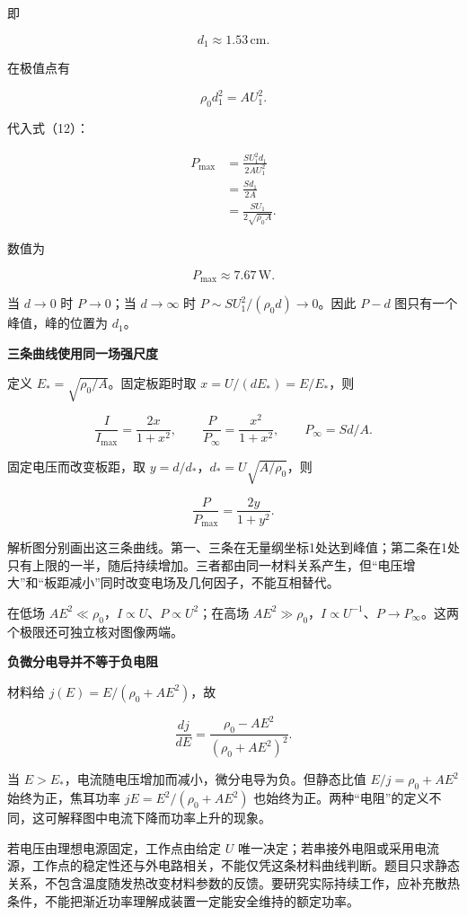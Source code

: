\documentclass[12pt,a4paper,UTF8]{ctexart}
\begin{document}
即

\[
\boxed{d_1\approx1.53\,\mathrm{cm}}.
\tag{15}
\]

在极值点有

\[
\rho_0d_1^2=AU_1^2.
\]

代入式（12）：

\[
\begin{aligned}
P_{\max}
&=\frac{SU_1^2d_1}{2AU_1^2}\\
&=\frac{Sd_1}{2A}\\
&=\frac{SU_1}{2\sqrt{\rho_0A}}.
\end{aligned}
\]

数值为

\[
\boxed{P_{\max}\approx7.67\,\mathrm W}.
\tag{16}
\]

当 \(d\to0\) 时 \(P\to0\)；当 \(d\to\infty\) 时
\(P\sim SU_1^2/(\rho_0d)\to0\)。因此 \(P-d\) 图只有一个峰值，峰的位置为
\(d_1\)。

\textbf{三条曲线使用同一场强尺度}

定义 \(E_*=\sqrt{\rho_0/A}\)。固定板距时取 \(x=U/(dE_*)=E/E_*\)，则

\[\frac I{I_{\max}}=\frac{2x}{1+x^2},\qquad \frac P{P_\infty}=\frac{x^2}{1+x^2},\qquad P_\infty=Sd/A.\]

固定电压而改变板距，取 \(y=d/d_*\)，\(d_*=U\sqrt{A/\rho_0}\)，则

\[\frac P{P_{\max}}=\frac{2y}{1+y^2}.\]

解析图分别画出这三条曲线。第一、三条在无量纲坐标1处达到峰值；第二条在1处只有上限的一半，随后持续增加。三者都由同一材料关系产生，但``电压增大''和``板距减小''同时改变电场及几何因子，不能互相替代。

在低场 \(AE^2\ll\rho_0\)，\(I\propto U\)、\(P\propto U^2\)；在高场
\(AE^2\gg\rho_0\)，\(I\propto U^{-1}\)、\(P\to P_\infty\)。这两个极限还可独立核对图像两端。

\textbf{负微分电导并不等于负电阻}

材料给 \(j(E)=E/(\rho_0+AE^2)\)，故

\[\frac{dj}{dE}=\frac{\rho_0-AE^2}{(\rho_0+AE^2)^2}.\]

当 \(E>E_*\)，电流随电压增加而减小，微分电导为负。但静态比值
\(E/j=\rho_0+AE^2\) 始终为正，焦耳功率 \(jE=E^2/(\rho_0+AE^2)\)
也始终为正。两种``电阻''的定义不同，这可解释图中电流下降而功率上升的现象。

若电压由理想电源固定，工作点由给定 \(U\)
唯一决定；若串接外电阻或采用电流源，工作点的稳定性还与外电路相关，不能仅凭这条材料曲线判断。题目只求静态关系，不包含温度随发热改变材料参数的反馈。要研究实际持续工作，应补充散热条件，不能把渐近功率理解成装置一定能安全维持的额定功率。
\end{document}
